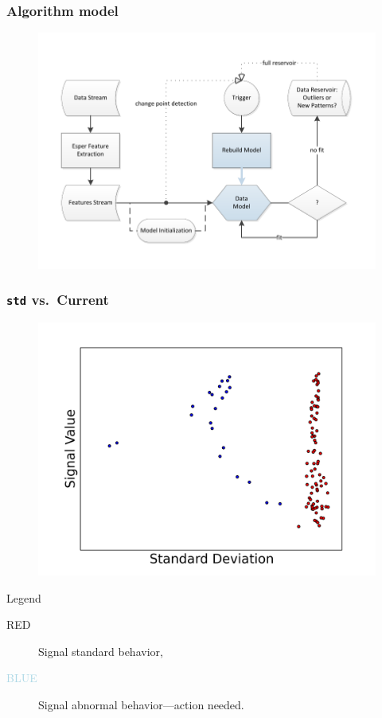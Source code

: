 \documentclass[aspectratio=169]{beamer}
\begin{document}
  \begin{frame}[foot]
    \frametitle{Algorithm model} 
    \begin{figure}[htbp]
      \includegraphics[height=.95\textheight]{./gfx/APC_Presentation.pdf}
    \end{figure}
  \end{frame}

  \begin{frame}[foot]
    \frametitle{\texttt{std} vs.\ Current} 
    \vspace*{-2em}
    \begin{figure}
      \includegraphics[height=.7\textheight]{./gfx/f2f5.png}
    \end{figure}
    \vspace*{-2em}
    \begin{block}{Legend}
    \begin{description}
      \item[\textcolor{lightred}{RED}] Signal standard behavior,
      \item[\textcolor{lightblue}{BLUE}] Signal abnormal behavior---action needed.
    \end{description}
    \end{block}
  \end{frame}
\end{document}
